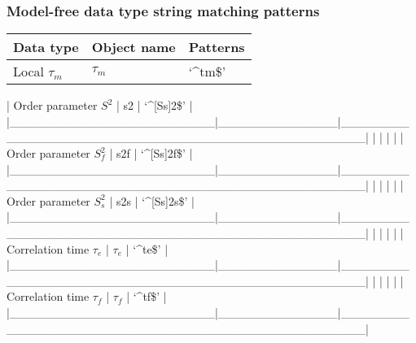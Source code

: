 \subsubsection{Model-free data type string matching patterns}



\begin{center}
\begin{tabular}{lll}
\toprule
Data type & Object name & Patterns \\
\midrule
 Local $\tau_m$                &  $\tau_m$            &  `\^{}tm\$'                                            \\
\bottomrule
\end{tabular}
\end{center}

| Order parameter $S^2$     | s2           | `\^{}[Ss]2\$'                                        |
|\_\_\_\_\_\_\_\_\_\_\_\_\_\_\_\_\_\_\_\_\_\_\_\_|\_\_\_\_\_\_\_\_\_\_\_\_\_\_|\_\_\_\_\_\_\_\_\_\_\_\_\_\_\_\_\_\_\_\_\_\_\_\_\_\_\_\_\_\_\_\_\_\_\_\_\_\_\_\_\_\_\_\_\_\_\_\_\_\_|
|                        |              |                                                  |
| Order parameter $S^2_f$    | s2f          | `\^{}[Ss]2f\$'                                       |
|\_\_\_\_\_\_\_\_\_\_\_\_\_\_\_\_\_\_\_\_\_\_\_\_|\_\_\_\_\_\_\_\_\_\_\_\_\_\_|\_\_\_\_\_\_\_\_\_\_\_\_\_\_\_\_\_\_\_\_\_\_\_\_\_\_\_\_\_\_\_\_\_\_\_\_\_\_\_\_\_\_\_\_\_\_\_\_\_\_|
|                        |              |                                                  |
| Order parameter $S^2_s$    | s2s          | `\^{}[Ss]2s\$'                                       |
|\_\_\_\_\_\_\_\_\_\_\_\_\_\_\_\_\_\_\_\_\_\_\_\_|\_\_\_\_\_\_\_\_\_\_\_\_\_\_|\_\_\_\_\_\_\_\_\_\_\_\_\_\_\_\_\_\_\_\_\_\_\_\_\_\_\_\_\_\_\_\_\_\_\_\_\_\_\_\_\_\_\_\_\_\_\_\_\_\_|
|                        |              |                                                  |
| Correlation time $\tau_e$    | $\tau_e$           | `\^{}te\$'                                           |
|\_\_\_\_\_\_\_\_\_\_\_\_\_\_\_\_\_\_\_\_\_\_\_\_|\_\_\_\_\_\_\_\_\_\_\_\_\_\_|\_\_\_\_\_\_\_\_\_\_\_\_\_\_\_\_\_\_\_\_\_\_\_\_\_\_\_\_\_\_\_\_\_\_\_\_\_\_\_\_\_\_\_\_\_\_\_\_\_\_|
|                        |              |                                                  |
| Correlation time $\tau_f$    | $\tau_f$           | `\^{}tf\$'                                           |
|\_\_\_\_\_\_\_\_\_\_\_\_\_\_\_\_\_\_\_\_\_\_\_\_|\_\_\_\_\_\_\_\_\_\_\_\_\_\_|\_\_\_\_\_\_\_\_\_\_\_\_\_\_\_\_\_\_\_\_\_\_\_\_\_\_\_\_\_\_\_\_\_\_\_\_\_\_\_\_\_\_\_\_\_\_\_\_\_\_|

